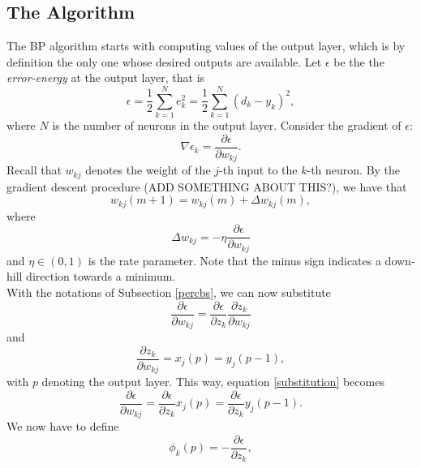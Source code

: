 \documentclass[%
    corpo=11pt,
    twoside,
    stile=classica,
    oldstyle,
    autoretitolo,
    tipotesi=magistrale,
    greek,
    evenboxes,
    english
]{toptesi}
\begin{document}
\subsection{The Algorithm}
The BP algorithm starts with computing values of the output layer, which is by definition the only one whose desired outputs are available. Let $\epsilon$ be the the \textit{error-energy} at the output layer, that is
\begin{equation}
\label{errorenergy}
\epsilon = \frac{1}{2}\sum_{k=1}^{N}e_k^2  =\frac{1}{2}\sum_{k=1}^{N}\left(d_k - y_k\right)^2,
\end{equation}
where $N$ is the number of neurons in the output layer. Consider the gradient of $\epsilon$:
\begin{equation}
\nabla \epsilon_k = \frac{\partial \epsilon}{\partial w_{kj}}.
\end{equation}
Recall that $w_{kj}$ denotes the weight of the $j$-th input to the $k$-th neuron. By the gradient descent procedure (ADD SOMETHING ABOUT THIS?), we have that 
\begin{equation}
w_{kj}(m+1) = w_{kj}(m) + \Delta w_{kj}(m),
\end{equation}
where 
\begin{equation}
\label{deltasub}
\Delta w_{kj} = -\eta \frac{\partial \epsilon}{\partial w_{kj}}
\end{equation}
and $\eta \in \left(0,1 \right)$ is the rate parameter. Note that the minus sign indicates a down-hill direction towards a minimum. \\
With the notations of Subsection \ref{percbs}, we can now substitute 
\begin{equation}
\label{substitution}
\frac{\partial \epsilon}{\partial w_{kj}} = \frac{\partial \epsilon}{\partial z_k} \frac{\partial z_k}{\partial w_{kj}}
\end{equation}
and 
\begin{equation}
\label{graupe6p8}
\frac{\partial z_k}{\partial w_{kj}} = x_j(p) = y_j(p -1),
\end{equation}
with $p$ denoting the output layer. This way, equation \eqref{substitution} becomes 
\begin{equation}
\label{newsubstitution}
\frac{\partial \epsilon}{\partial w_{kj}} = \frac{\partial \epsilon}{\partial z_k}x_j(p) = \frac{\partial \epsilon}{\partial z_k} y_j(p-1).
\end{equation}
We now have to define 
\begin{equation}
\label{phisub}
\phi_k(p) = - \frac{\partial \epsilon}{\partial z_k},
\end{equation}
\end{document}
